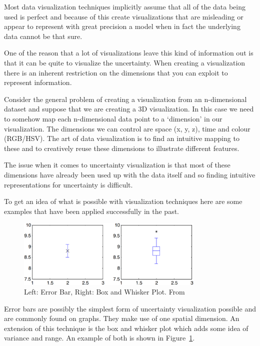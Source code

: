 Most data visualization techniques implicitly assume that all of the data being used is perfect and because of this create visualizations that are misleading or appear to represent with great precision a model when in fact the underlying data cannot be that sure.

One of the reason that a lot of visualizations leave this kind of information out is that it can be quite to visualize the uncertainty. When creating a visualization there is an inherent restriction on the dimensions that you can exploit to represent information.

Consider the general problem of creating a visualization from an n-dimensional dataset and suppose that we are creating a 3D visualization. In this case we need to somehow map each n-dimensional data point to a ‘dimension’ in our visualization. The dimensions we can control are space (x, y, z), time and colour (RGB/HSV). The art of data visualization is to find an intuitive mapping to these and to creatively reuse these dimensions to illustrate different features.

The issue when it comes to uncertainty visualization is that most of these dimensions have already been used up with the data itself and so finding intuitive representations for uncertainty is difficult.

To get an idea of what is possible with visualization techniques here are some examples that have been applied successfully in the past.

\begin{figure}[h]
    \centering
	\includegraphics[width=0.8\textwidth]{images/background/error_bars.png}
    \caption{Left: Error Bar, Right: Box and Whisker Plot. From \cite{uncertaintyoverview}}
    \label{fig:error_bars}
\end{figure}

Error bars are possibly the simplest form of uncertainty visualization possible and are commonly found on graphs. They make use of one spatial dimension. An extension of this technique is the box and whisker plot which adds some idea of variance and range. An example of both is shown in Figure~\ref{fig:error_bars}.

